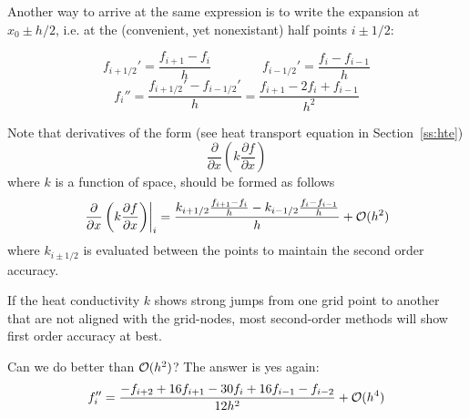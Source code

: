 Another way to arrive at the same expression is to write the expansion at $x_0 \pm h/2$, 
i.e. at the (convenient, yet nonexistant) half points $i\pm 1/2$:

\begin{center}

\end{center}


%     
%

\begin{equation}
f_{i+1/2}'=\frac{f_{i+1}-f_i}{h}
\quad\quad
\quad\quad
f_{i-1/2}'=\frac{f_{i}-f_{i-1}}{h}
\end{equation}
\begin{equation}
f_i''=\frac{f_{i+1/2}'-f_{i-1/2}'}{h} = 
\frac{f_{i+1}-2f_i+f_{i-1}}{h^2} 
\end{equation}

Note that derivatives of the form (see heat transport equation in Section~\ref{ss:hte}) 
\begin{equation}
\frac{\partial }{\partial x} \left(  k  \frac{\partial f}{\partial x} \right)
\end{equation}
where $k$ is a function of space, should be formed as follows
\begin{equation}
\left. \frac{\partial }{\partial x} \left(  k  \frac{\partial f}{\partial x} \right) \right|_i
=
\frac{ k_{i+1/2} \frac{f_{i+1}-f_i}{h} - k_{i-1/2}\frac{f_i-f_{i-1}}{h}    }{h} + {\cal O}(h^2)
\end{equation}
where $k_{i\pm 1/2}$ is evaluated between the points to maintain the second order accuracy.

\begin{remark}
If the heat conductivity $k$ shows strong jumps from one grid point to another that are not aligned with
the grid-nodes, most second-order methods will show first order accuracy at best.
\end{remark}


\noindent Can we do better than ${\cal O}(h^2)$? The answer is yes again:
\[
f_i'' = \frac{-f_{i+2} + 16 f_{i+1} -30 f_i + 16 f_{i-1} - f_{i-2} }{12 h^2} + {\cal O}(h^4)
\]



\vspace{1cm}




